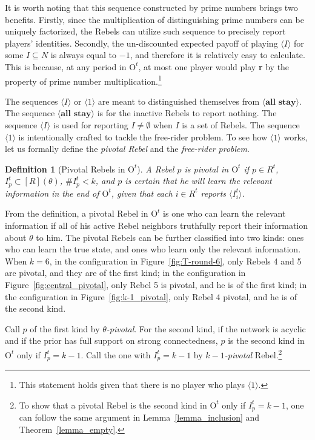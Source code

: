 \documentclass[12pt,letter]{article}
\newcommand{\Omicron}{\mathrm{O}}
\newtheorem{definition}{Definition}[section]
\theoremstyle{definition}
\theoremstyle{remark}
\theoremstyle{claim}
\begin{document}
It is worth noting that this sequence constructed by prime numbers brings two benefits. Firstly, since the multiplication of distinguishing prime numbers can be uniquely factorized, the Rebels can utilize such sequence to precisely report players' identities. Secondly, the un-discounted expected payoff of playing $\langle I \rangle$ for some $I\subseteq N$ is always equal to $-1$, and therefore it is relatively easy to calculate. This is because, at any period in $\Omicron^{t}$, at most one player would play \textbf{r} by the property of prime number multiplication.\footnote{This statement holds given that there is no player who plays $\langle 1 \rangle$.} 

The sequences $\langle I \rangle$ or $\langle 1 \rangle$ are meant to distinguished themselves from $\langle \textbf{all stay} \rangle$. The sequence $\langle \textbf{all stay} \rangle$ is for the inactive Rebels to report nothing. The sequence $\langle I \rangle$ is used for reporting $I\neq \emptyset$ when $I$ is a set of Rebels.  The sequence $\langle 1 \rangle$ is intentionally crafted to tackle the free-rider problem. To see how $\langle 1 \rangle$ works, let us formally define the \textit{pivotal Rebel} and the \textit{free-rider problem}. 
\begin{definition}[Pivotal Rebels in $\Omicron^t$]
A Rebel $p$ is pivotal in $\Omicron^t$ if $p\in R^t$, $I^t_p\subset [R](\theta)$, $\# I^t_p<k$, and $p$ is certain that he will learn the relevant information in the end of $\Omicron^t$, given that each $i\in R^t$ reports $\langle I^t_i \rangle$.
\end{definition}

From the definition, a pivotal Rebel in $\Omicron^t$ is one who can learn the relevant information if all of his active Rebel neighbors truthfully report their information about $\theta$ to him. The pivotal Rebels can be further classified into two kinds: ones who can learn the true state, and ones who learn only the relevant information. When $k=6$, in the configuration in Figure~\ref{fig:T-round-6}, only Rebels 4 and 5 are pivotal, and they are of the first kind; in the configuration in Figure~\ref{fig:central_pivotal}, only Rebel 5 is pivotal, and he is of the first kind; in the configuration in Figure~\ref{fig:k-1_pivotal}, only Rebel 4 pivotal, and he is of the second kind.

Call $p$ of the first kind by \textit{$\theta$-pivotal}. For the second kind, if the network is acyclic and if the prior has full support on strong connectedness, $p$ is the second kind in $\Omicron^{t}$ only if $I^{t}_p=k-1$. Call the one with $I^t_p=k-1$ by \textit{$k-1$-pivotal} Rebel.\footnote{To show that a pivotal Rebel is the second kind in $\Omicron^{t}$ only if $I^{t}_p=k-1$, one can follow the same argument in Lemma~\ref{lemma_inclusion} and Theorem~\ref{lemma_empty}.}
\end{document}
